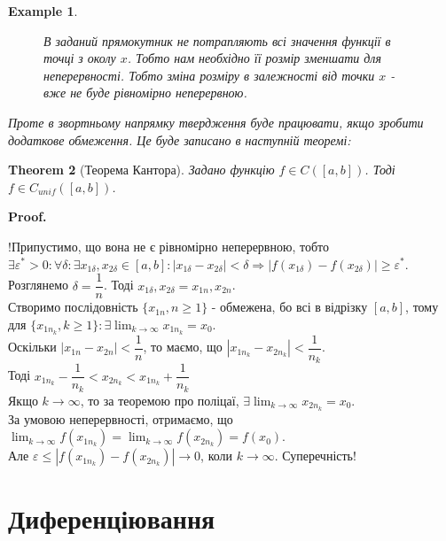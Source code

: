 \documentclass[a4paper, 14pt]{article}
\makeatletter
\def\huge{\displaystyle}
\def\qed{$\blacksquare$}
\theoremstyle{theoremdd}
\newtheorem{theorem}{Theorem}[subsection]
\theoremstyle{theoremdd}
\theoremstyle{theoremdd}
\theoremstyle{theoremdd}
\newtheorem{example}[theorem]{Example}
\theoremstyle{theoremdd}
\theoremstyle{theoremdd}
\theoremstyle{theoremdd}
\theoremstyle{theoremdd}
\renewenvironment{proof}[1][Proof.\\]{\par
\pushQED{\hfill \qed}%
\normalfont \topsep6\p@\@plus6\p@\relax
\trivlist
\item\relax
{\bfseries
#1\@addpunct{.}}\hspace\labelsep\ignorespaces
}{%
\popQED\endtrivlist\@endpefalse
}
\makeatother
\begin{document}
\begin{example}
\begin{figure}[H]
\caption*{В заданий прямокутник не потрапляють всі значення функції в точці з околу $x$. Тобто нам необхідно її розмір зменшати для неперервності. Тобто зміна розміру в залежності від точки $x$ - вже не буде рівномірно неперервною.}
\end{figure}

Проте в звортньому напрямку твердження буде працювати, якщо зробити додаткове обмеження. Це буде записано в наступній теоремі:
\end{example}

\begin{theorem}[Теорема Кантора]
Задано функцію $f \in C([a,b])$. Тоді $f \in C_{unif}([a,b])$.
\end{theorem}

\begin{proof}
!Припустимо, що вона не є рівномірно неперервною, тобто\\
$\exists \varepsilon^* > 0: \forall \delta: \exists x_{1 \delta}, x_{2 \delta} \in [a,b]: |x_{1 \delta} - x_{2 \delta}| < \delta \Rightarrow |f(x_{1 \delta}) - f(x_{2 \delta})| \geq \varepsilon^*$.\\
Розглянемо $\delta = \dfrac{1}{n}$. Тоді $x_{1 \delta}, x_{2 \delta} = x_{1n}, x_{2n}$.\\
Створимо послідовність $\{x_{1n}, n \geq 1\}$ - обмежена, бо всі в відрізку $[a,b]$, тому \\ 
для $\{x_{{1n}_k}, k \geq 1\}: \exists \huge \lim_{k \to \infty} x_{{1n}_k} = x_0$.\\
Оскільки $|x_{1n} - x_{2n}| < \dfrac{1}{n}$, то маємо, що $|x_{1n_k} - x_{2n_k}| < \dfrac{1}{n_k}$.\\
Тоді $x_{1n_k} - \dfrac{1}{n_k} < x_{2n_k} < x_{1n_k} + \dfrac{1}{n_k}$\\
Якщо $k \to \infty$, то за теоремою про поліцаї, $\exists \huge \lim_{k \to \infty} x_{2n_k} = x_0$.\\
За умовою неперервності, отримаємо, що $\huge\lim_{k \to \infty} f(x_{1n_k}) = \lim_{k \to \infty} f(x_{2n_k}) = f(x_0)$.\\
Але $\varepsilon \leq |f(x_{1n_k}) - f(x_{2n_k})| \to 0$, коли $k \to \infty$. Суперечність!
\end{proof}
\newpage


\section{Диференціювання}
\end{document}
